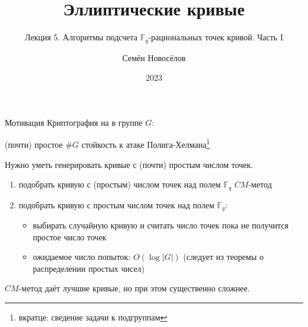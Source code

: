 \documentclass{beamer}
\title{Эллиптические кривые}
\subtitle{Лекция 5. Алгоритмы подсчета $\mathbb{F}_q$-рациональных точек кривой. Часть I}
\author{Семён Новосёлов}
\institute{БФУ им. И. Канта}
\date{2023}
\begin{document}
\frame{\titlepage}

\begin{frame}{Мотивация}
    Криптография на  в группе $G$:
    \begin{center}
    (почти) простое $\#G$ \structure{$\implies$} стойкость к атаке Полига-Хелмана\footnote{вкратце: сведение задачи к подгруппам}
 
    \vspace{1em}
    \structure{$\Downarrow$}
    \end{center}
    
    Нужно уметь генерировать кривые с (почти) простым числом точек.
\end{frame}

\begin{frame}
	\begin{enumerate}
		\item подобрать кривую с  (простым) числом точек над полем $\mathbb{F}_q$ \structure{$\implies$} $CM$-метод
		\vspace{0.5em}
		\item подобрать кривую с простым числом точек над полем $\mathbb{F}_q$:
		\begin{itemize}
			\item выбирать случайную кривую и считать число точек пока не получится простое число точек
			\item ожидаемое число попыток: $O(\log{|G|})$ (следует из теоремы о распределении простых чисел)
		\end{itemize}
	\end{enumerate}
	\vspace{0.5em}
	$CM$-метод даёт лучшие кривые, но при этом существенно сложнее.
\end{frame}
\end{document}
